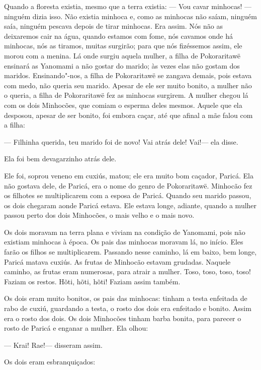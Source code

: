  

 Quando a floresta existia, mesmo que a terra
existia: 
--- Vou cavar minhocas! --- ninguém dizia isso. 
Não existia minhoca e, como as minhocas não saíam, ninguém saía, ninguém
pescava depois de tirar minhocas. Era assim. Nós não as deixaremos cair
na água, quando estamos com fome, nós cavamos onde há minhocas, nós as
tiramos, muitas surgirão; para que nós fizéssemos assim, ele morou com a
menina. Lá onde surgiu aquela mulher, a filha de Pokoraritawë ensinará
as Yanomami a não gostar do marido;  às vezes elas não gostam dos maridos. Ensinando"-nos, a filha de Pokoraritawë se zangava demais, pois
estava com medo, não queria seu marido. Apesar de ele ser muito bonito,
a mulher não o queria, a filha de Pokoraritawë fez as minhocas surgirem.
A mulher chegou lá com os dois Minhocões, que comiam o esperma deles
mesmos. Aquele que ela desposou, apesar de ser bonito, foi embora caçar,
até que afinal a mãe falou com a filha: 

--- Filhinha querida, teu marido foi de novo! Vai atrás dele! Vai!---
ela disse. 

Ela foi bem devagarzinho atrás dele. 

Ele foi, soprou veneno em cuxiús, matou; ele era muito bom caçador,
Paricá. Ela não gostava dele, de Paricá, era o nome do genro de
Pokoraritawë. Minhocão fez os filhotes se multiplicarem com a esposa de
Paricá. Quando seu marido passou, os dois chegaram aonde Paricá estava.
Ele estava longe, adiante, quando a mulher passou perto dos dois
Minhocões, o mais velho e o mais novo. 

Os dois moravam na terra plana e viviam na condição de Yanomami, pois
não existiam minhocas à época. Os pais das minhocas moravam lá, no
início. Eles farão os filhos se multiplicarem. Passando nesse caminho, lá
em baixo, bem longe, Paricá matava cuxiús. As frutas de Minhocão estavam
grudadas. Naquele caminho, as frutas eram numerosas, para atrair a
mulher. Toso, toso, toso, toso! Faziam os restos. Hõti, hõti, hõti!
Faziam assim também. 

Os dois eram muito bonitos, os pais das minhocas: tinham a testa
enfeitada de rabo de cuxiú, guardando a testa, o rosto dos dois era
enfeitado e bonito. Assim era o rosto dos dois. Os dois Minhocões tinham
barba bonita, para parecer o rosto de Paricá e enganar a mulher. Ela
olhou: 

--- Krai! Rae!--- disseram assim. 

Os dois eram esbranquiçados: 

